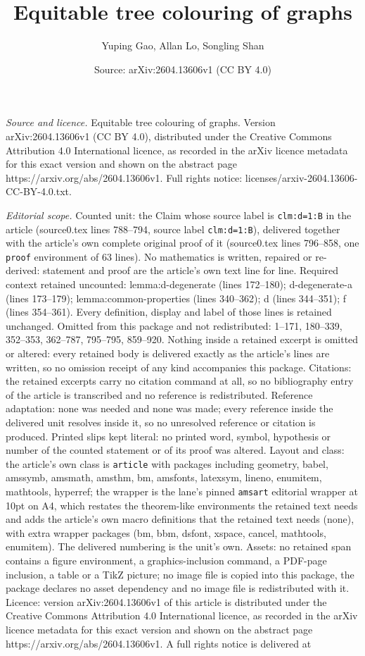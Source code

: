 \documentclass[10pt,a4paper]{amsart}
\title[Equitable tree colouring of graphs]{Equitable tree colouring of graphs}
\author{Yuping Gao, Allan Lo, Songling Shan}
\date{Source: arXiv:2604.13606v1 (CC BY 4.0)}
\begin{document}
\maketitle

\noindent\emph{Source and licence.} Equitable tree colouring of graphs. Version arXiv:2604.13606v1 (CC BY 4.0), distributed under the Creative Commons Attribution 4.0 International licence, as recorded in the arXiv licence metadata for this exact version and shown on the abstract page https://arxiv.org/abs/2604.13606v1. Full rights notice: licenses/arxiv-2604.13606-CC-BY-4.0.txt.\par\smallskip

\noindent\textit{Editorial scope.} Counted unit: the Claim whose source label is \texttt{clm:d=1:B} in the article (source0.tex lines 788--794, source label \texttt{clm:d=1:B}), delivered together with the article's own complete original proof of it (source0.tex lines 796--858, one \texttt{proof} environment of 63 lines). No mathematics is written, repaired or re-derived: statement and proof are the article's own text line for line. Required context retained uncounted: lemma:d-degenerate (lines 172--180); d-degenerate-a (lines 173--179); lemma:common-properties (lines 340--362); d (lines 344--351); f (lines 354--361). Every definition, display and label of those lines is retained unchanged. Omitted from this package and not redistributed: 1--171, 180--339, 352--353, 362--787, 795--795, 859--920. Nothing inside a retained excerpt is omitted or altered: every retained body is delivered exactly as the article's lines are written, so no omission receipt of any kind accompanies this package. Citations: the retained excerpts carry no citation command at all, so no bibliography entry of the article is transcribed and no reference is redistributed. Reference adaptation: none was needed and none was made; every reference inside the delivered unit resolves inside it, so no unresolved reference or citation is produced. Printed slips kept literal: no printed word, symbol, hypothesis or number of the counted statement or of its proof was altered. Layout and class: the article's own class is \texttt{article} with packages including geometry, babel, amssymb, amsmath, amsthm, bm, amsfonts, latexsym, lineno, enumitem, mathtools, hyperref; the wrapper is the lane's pinned \texttt{amsart} editorial wrapper at 10pt on A4, which restates the theorem-like environments the retained text needs and adds the article's own macro definitions that the retained text needs (none), with extra wrapper packages (bm, bbm, dsfont, xspace, cancel, mathtools, enumitem). The delivered numbering is the unit's own. Assets: no retained span contains a figure environment, a graphics-inclusion command, a PDF-page inclusion, a table or a TikZ picture; no image file is copied into this package, the package declares no asset dependency and no image file is redistributed with it. Licence: version arXiv:2604.13606v1 of this article is distributed under the Creative Commons Attribution 4.0 International licence, as recorded in the arXiv licence metadata for this exact version and shown on the abstract page https://arxiv.org/abs/2604.13606v1. A full rights notice is delivered at 
\end{document}
